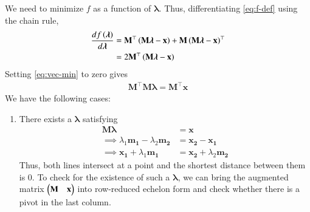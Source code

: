 \documentclass[journal,12pt,twocolumn]{IEEEtran}
\renewcommand{\vec}[1]{\boldsymbol{\mathbf{#1}}}
\begin{document}
\begin{enumerate}
    We need to minimize $f$ as a function of $\vec{\lambda}$. Thus, 
    differentiating \eqref{eq:f-def} using the chain rule,
    \begin{align}
        \frac{df\brak{\vec{\lambda}}}{d\vec{\lambda}} &= \vec{M}^\top\brak{\vec{M\lambda}-\vec{x}}+\vec{M}\brak{\vec{M\lambda}-\vec{x}}^\top \\
                                                      &= 2\vec{M}^\top\brak{\vec{M\lambda}-\vec{x}}
        \label{eq:vec-min}
    \end{align}
    Setting \eqref{eq:vec-min} to zero gives
    \begin{align}
        \vec{M}^\top\vec{M\lambda} = \vec{M}^\top\vec{x}
        \label{eq:vec-eqn}
    \end{align}
    We have the following cases:
    \begin{enumerate}
        \item There exists a $\vec{\lambda}$ satisfying
        \begin{align}
            \vec{M}\vec{\lambda} &= \vec{x} \\
            \implies \lambda_1\vec{m_1} - \lambda_2\vec{m_2} &= \vec{x_2}-\vec{x_1} \\
            \implies \vec{x_1} + \lambda_1\vec{m_1} &= \vec{x_2} + \lambda_2\vec{m_2}
            \label{eq:intersect}
        \end{align}
        Thus, both lines intersect at a point and the shortest
        distance between them is 0. To check for the existence of such a 
        $\vec{\lambda}$, we can bring the augmented matrix 
        $\myvec{\vec{M}&\vec{x}}$ into row-reduced echelon form and check 
        whether there is a pivot in the last column.


\end{enumerate}
\end{enumerate}
\end{document}
